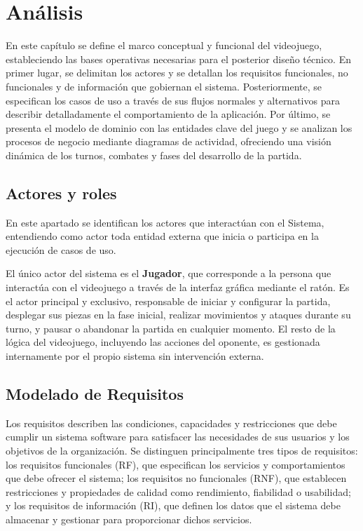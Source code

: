 \chapter{Análisis}

En este capítulo se define el marco conceptual y funcional del videojuego, estableciendo las bases operativas necesarias para el posterior diseño técnico. En primer lugar, se delimitan los actores y se detallan los requisitos funcionales, no funcionales y de información que gobiernan el sistema. Posteriormente, se especifican los casos de uso a través de sus flujos normales y alternativos para describir detalladamente el comportamiento de la aplicación. Por último, se presenta el modelo de dominio con las entidades clave del juego y se analizan los procesos de negocio mediante diagramas de actividad, ofreciendo una visión dinámica de los turnos, combates y fases del desarrollo de la partida.

\section{Actores y roles}

En este apartado se identifican los actores que interactúan con el Sistema, entendiendo como actor toda entidad externa que inicia o participa en la ejecución de casos de uso.

El único actor del sistema es el \textbf{Jugador}, que corresponde a la persona que interactúa con el videojuego a través de la interfaz gráfica mediante el ratón. Es el actor principal y exclusivo, responsable de iniciar y configurar la partida, desplegar sus piezas en la fase inicial, realizar movimientos y ataques durante su turno, y pausar o abandonar la partida en cualquier momento. El resto de la lógica del videojuego, incluyendo las acciones del oponente, es gestionada internamente por el propio sistema sin intervención externa.

\clearpage

\section{Modelado de Requisitos}

Los requisitos describen las condiciones, capacidades y restricciones que debe cumplir un sistema software para satisfacer las necesidades de sus usuarios y los objetivos de la organización. Se distinguen principalmente tres tipos de requisitos: los requisitos funcionales (RF), que especifican los servicios y comportamientos que debe ofrecer el sistema; los requisitos no funcionales (RNF), que establecen restricciones y propiedades de calidad como rendimiento, fiabilidad o usabilidad; y los requisitos de información (RI), que definen los datos que el sistema debe almacenar y gestionar para proporcionar dichos servicios.

